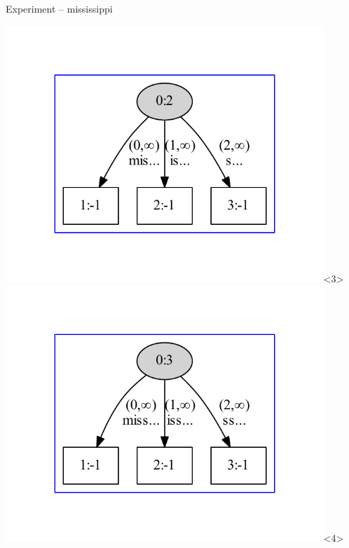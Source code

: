 \begin{frame}{Experiment -- mississippi}
\begin{overlayarea}{\textwidth}{\textheight}
\includegraphics[keepaspectratio,height=0.9\textheight,width=0.9\textwidth]{mis.pdf}<3>
\includegraphics[keepaspectratio,height=0.9\textheight,width=0.9\textwidth]{miss.pdf}<4>

\end{overlayarea}
\end{frame}

